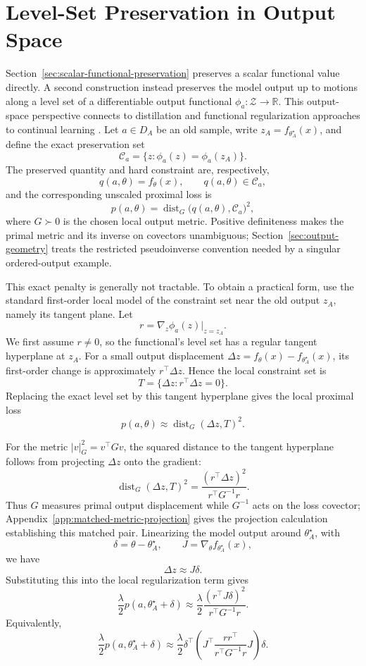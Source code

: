 \section{Level-Set Preservation in Output Space}
\label{sec:level-set-preservation}

Section~\ref{sec:scalar-functional-preservation} preserves a scalar functional value directly. A second construction instead preserves the model output up to motions along a level set of a differentiable output functional $\phi_a:\mathcal Z\to\mathbb R$. This output-space perspective connects to distillation and functional regularization approaches to continual learning \citep{LwF,Distillation,FunctionalGP,FROMP}. Let $a \in D_A$ be an old sample, write $z_A=f_{\theta_A^\star}(x)$, and define the exact preservation set
\[
\mathcal C_a=
\{z:\phi_a(z)=\phi_a(z_A)\}.
\]
The preserved quantity and hard constraint are, respectively,
\[
q(a,\theta)=f_\theta(x),
\qquad
q(a,\theta)\in\mathcal C_a,
\]
and the corresponding unscaled proximal loss is
\[
p(a,\theta) =
\operatorname{dist}_{G}\big(q(a,\theta),\mathcal C_a\big)^2,
\]
where $G\succ0$ is the chosen local output metric. Positive definiteness makes the primal metric and its inverse on covectors unambiguous; Section~\ref{sec:output-geometry} treats the restricted pseudoinverse convention needed by a singular ordered-output example.

This exact penalty is generally not tractable. To obtain a practical form, use the standard first-order local model of the constraint set near the old output $z_A$, namely its tangent plane. Let
\[
r=
\nabla_z \phi_a(z)\big|_{z=z_A}.
\]
We first assume $r\ne0$, so the functional's level set has a regular tangent hyperplane at $z_A$.
For a small output displacement $\Delta z=f_\theta(x)-f_{\theta_A^\star}(x)$, its first-order change is approximately $r^\top \Delta z$.
Hence the local constraint set is
\[
T=
\{\Delta z:r^\top \Delta z=0\}.  
\]
Replacing the exact level set by this tangent hyperplane gives the local proximal loss
\[
p(a,\theta)  
\approx  
\operatorname{dist}_{G}(\Delta z,T)^2.  
\]

For the metric $|v|_G^2=v^\top G v$, the squared distance to the tangent hyperplane follows from projecting $\Delta z$ onto the gradient:
\[
\operatorname{dist}_{G}(\Delta z,T)^2 =
\frac{(r^\top \Delta z)^2}{r^\top G^{-1}r}.  
\]
Thus $G$ measures primal output displacement while $G^{-1}$ acts on the loss covector; Appendix~\ref{app:matched-metric-projection} gives the projection calculation establishing this matched pair.
Linearizing the model output around $\theta_A^\star$, with
\[
\delta=\theta-\theta_A^\star,  
\qquad  
J=\nabla_\theta f_{\theta_A^\star}(x),  
\]
we have
\[
\Delta z \approx J\delta.  
\]
Substituting this into the local regularization term gives
\[
\frac{\lambda}{2}p(a,\theta_A^\star+\delta)  
\approx  
\frac{\lambda}{2}  
\frac{(r^\top J\delta)^2}{r^\top G^{-1}r}.  
\]
Equivalently,
\[
\frac{\lambda}{2}p(a,\theta_A^\star+\delta)  
\approx  
\frac{\lambda}{2}  
\delta^\top  
\left(
J^\top  
\frac{rr^\top}{r^\top G^{-1}r}  
J  
\right)
\delta.  
\]

